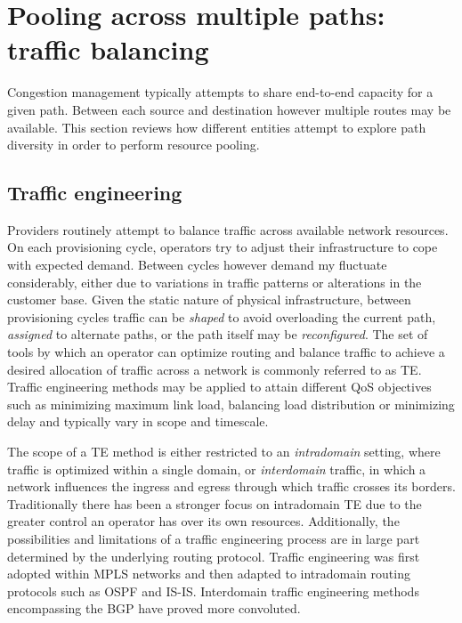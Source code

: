 \section {Pooling across multiple paths: traffic balancing}
\label{sec:resourcepooling:balancing}

Congestion management typically attempts to share end-to-end capacity for a given path.
Between each source and destination however multiple routes may be available.
This section reviews how different entities attempt to explore path diversity in order to perform resource pooling.

\subsection{Traffic engineering}

Providers routinely attempt to balance traffic across available network resources.
On each provisioning cycle, operators try to adjust their infrastructure to cope with expected demand.
Between cycles however demand my fluctuate considerably, either due to variations in traffic patterns or alterations in the customer base.
Given the static nature of physical infrastructure, between provisioning cycles traffic can be \emph{shaped} to avoid overloading the current path, \emph{assigned} to alternate paths, or the path itself may be \emph{reconfigured}.
The set of tools by which an operator can optimize routing and balance traffic to achieve a desired allocation of traffic across a network is commonly referred to as \ac{TE}.
Traffic engineering methods may be applied to attain different \ac{QoS} objectives such as minimizing maximum link load, balancing load distribution or minimizing delay and typically vary in scope and timescale.

The scope of a \ac{TE} method is either restricted to an \emph{intradomain} setting, where traffic is optimized within a single domain, or \emph{interdomain} traffic, in which a network influences the ingress and egress through which traffic crosses its borders.
Traditionally there has been a stronger focus on intradomain \ac{TE} due to the greater control an operator has over its own resources.
Additionally, the possibilities and limitations of a traffic engineering process are in large part determined by the underlying routing protocol.
Traffic engineering was first adopted within \ac{MPLS} networks and then adapted to intradomain routing protocols such as \ac{OSPF} and \ac{IS-IS}.
Interdomain traffic engineering methods encompassing the \ac{BGP} have proved more convoluted.

